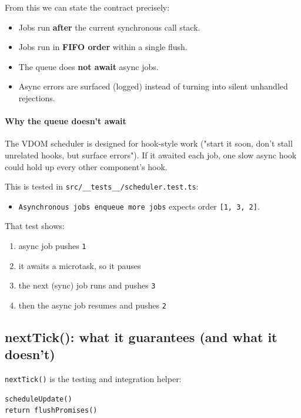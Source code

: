 From this we can state the contract precisely:

\begin{itemize}
  \item Jobs run \textbf{after} the current synchronous call stack.
  \item Jobs run in \textbf{FIFO order} within a single flush.
  \item The queue does \textbf{not await} async jobs.
  \item Async errors are surfaced (logged) instead of turning into silent unhandled rejections.
\end{itemize}

\paragraph{Why the queue doesn’t await}

The VDOM scheduler is designed for hook-style work ("start it soon, don’t stall unrelated hooks, but surface errors").
If it awaited each job, one slow async hook could hold up every other component’s hook.

This is tested in \texttt{src/\_\_tests\_\_/scheduler.test.ts}:

\begin{itemize}
  \item \texttt{Asynchronous jobs enqueue more jobs} expects order \texttt{[1, 3, 2]}.
\end{itemize}

That test shows:

\begin{enumerate}
  \item async job pushes \texttt{1}
  \item it awaits a microtask, so it pauses
  \item the next (sync) job runs and pushes \texttt{3}
  \item then the async job resumes and pushes \texttt{2}
\end{enumerate}

\subsection{nextTick(): what it guarantees (and what it doesn’t)}

\texttt{nextTick()} is the testing and integration helper:

\begin{verbatim}
scheduleUpdate()
return flushPromises()
\end{verbatim}


